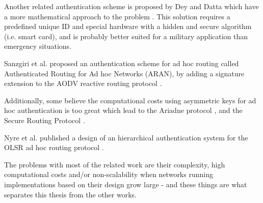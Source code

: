 Another related authentication scheme is proposed by Dey and Datta which have a
more mathematical approach to the problem \cite{springerlink:Haimabati}. This
solution requires a predefined unique ID and special hardware with a hidden and
secure algorithm (i.e. smart card), and is probably better suited for a
military application than emergency situations.

Sanzgiri et al. proposed an authentication scheme for ad hoc routing called
Authenticated Routing for Ad hoc Networks (ARAN), by adding a signature
extension to the AODV reactive routing protocol \cite{sanzgiri2005authenticated}.

Additionally, some believe the computational costs using asymmetric keys for ad
hoc authentication is too great which lead to the Ariadne protocol
\cite{hu2005ariadne}, and the Secure Routing Protocol
\cite{papadimitratos2002secure}.

Nyre et al. published a design of an hierarchical authentication system for the
OLSR ad hoc routing protocol \cite{nyre2009secure}.

The problems with most of the related work are their complexity, high
computational costs and/or non-scalability when networks running implementations
based on their design grow large - and these things are what separates this
thesis from the other works.

